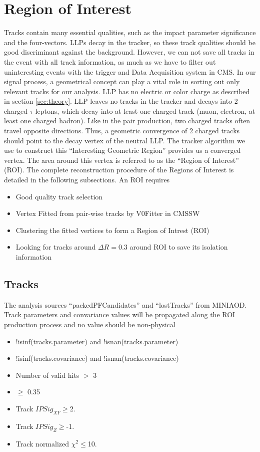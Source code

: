 \section{Region of Interest}\label{sec:ROIs}
Tracks contain many essential qualities, such as the impact parameter significance and the four-vectors.
LLPs decay in the tracker, so these track qualities should be good discriminant against the background.
However, we can not save all tracks in the event with all track information, as much as we have to filter out uninteresting events with the trigger and Data Acquisition system in CMS.
In our signal process, a geometrical concept can play a vital role in sorting out only relevant tracks for our analysis.
LLP has no electric or color charge as described in section \ref{sec:theory}.
LLP leaves no tracks in the tracker and decays into 2 charged $\tau$ leptons, which decay into at least one charged track (muon, electron, at least one charged hadron).
Like in the pair production, two charged tracks often travel opposite directions.
Thus, a geometric convergence of 2 charged tracks should point to the decay vertex of the neutral LLP.
The tracker algorithm we use to construct this ``Interesting Geometric Region'' provides us a converged vertex.
The area around this vertex is referred to as the ``Region of Interest'' (ROI).
The complete reconstruction procedure of the Regions of Interest is detailed in the following subsections.
An ROI requires
\begin{itemize}
  \item Good quality track selection
  \item Vertex Fitted from pair-wise tracks by V0Fitter in CMSSW
  \item Clustering the fitted vertices to form a Region of Intrest (ROI)
  \item Looking for tracks around $\Delta R=0.3$ around ROI to save its isolation information
\end{itemize}

\subsection{Tracks}\label{sec:ROI_tracks}

The analysis sources ``packedPFCandidates'' and ``lostTracks'' from MINIAOD.
Track parameters and convariance values will be propagated along the ROI production process and no value should be non-physical
\begin{itemize}
  \item !isinf(tracks.parameter)  and !isnan(tracks.parameter) 
  \item !isinf(tracks.covariance) and !isnan(tracks.covariance) 
  \item Number of valid hits $>$ 3
  \item \pt $\geq$ 0.35
  \item Track $IPSig_{XY}\geq$2.
  \item Track $IPSig_{Z}\geq$-1.
  \item Track normalized $\chi^{2}\leq$10.
\end{itemize}


